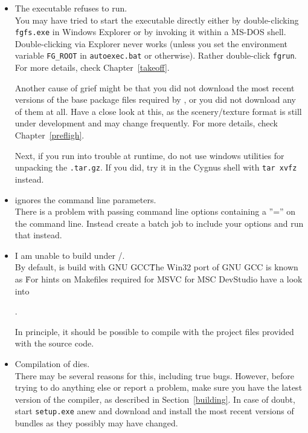\begin{itemize}
\item{The executable refuses to run.}\\
 You may have tried to start the executable directly either by
 double-clicking \texttt{fgfs.exe} in Windows Explorer or by invoking it
 within a MS-DOS shell. Double-clicking via Explorer never works
 (unless you set the environment variable \texttt{FG\_ROOT}
 in \texttt{autoexec.bat} or otherwise). Rather double-click \texttt{fgrun}.
  For more details, check Chapter~\ref{takeoff}.

 Another cause of grief might be that you did not download the
 most recent versions of the base package files required by \FlightGear{}, or
 you did not download any of them at all. Have a close look
 at this, as the scenery/texture format is still under development and may
 change frequently.  For more details, check Chapter~\ref{prefligh}.

 Next, if you run into trouble at runtime, do not use windows utilities for unpacking the
 \texttt{.tar.gz}. If you did, try it in the Cygnus shell with \texttt{tar xvfz}
 instead.

\item{\FlightGear{} ignores the command line parameters.}\\
 There is a problem with passing command line options containing a
 ''='' on the command line. Instead create a batch job to include your options and run that instead.

\item{I am unable to build \FlightGear{} under /.}\\
 By default, \FlightGear{} is build with GNU GCC\. The Win32 port of GNU GCC is known as
 \. For hints on Makefiles
 required for MSVC for MSC DevStudio have a look into
  \medskip

 .
  \medskip

 \noindent
In principle, it should be possible to compile \FlightGear{} with the project files provided with the source code.

\item{Compilation of \FlightGear{} dies.}\\
 There may be several reasons for this, including true bugs. However, before trying to do
 anything else or report a problem, make sure you have the latest version of the
 \Cygwin{} compiler, as described in Section~\ref{building}. In case of doubt, start
 \texttt{setup.exe} anew and download and install the most recent versions of bundles
 as they possibly may have changed.
\end{itemize}


